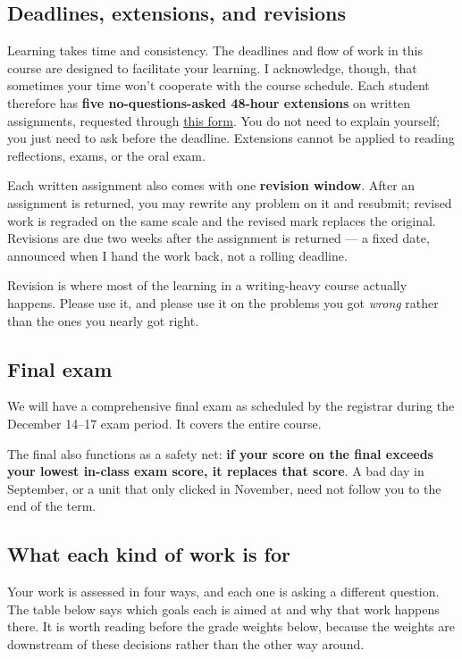 \documentclass[11pt,twoside]{amsart}
\begin{document}
\subsection*{Deadlines, extensions, and revisions}
Learning takes time and consistency. The deadlines and flow of work in this course are designed to facilitate your learning. I acknowledge, though, that sometimes your time won't cooperate with the course schedule. Each student therefore has \textbf{five no-questions-asked 48-hour extensions} on written assignments, requested through \href{https://docs.google.com/forms/d/e/1FAIpQLSfIfgx44SFtUzefTNr-80yz35MVJaUqQttt96xVTU5mCQCOgg/viewform}{this form}. You do not need to explain yourself; you just need to ask before the deadline. Extensions cannot be applied to reading reflections, exams, or the oral exam.

Each written assignment also comes with one \textbf{revision window}. After an assignment is returned, you may rewrite any problem on it and resubmit; revised work is regraded on the same scale and the revised mark replaces the original. Revisions are due two weeks after the assignment is returned --- a fixed date, announced when I hand the work back, not a rolling deadline.

Revision is where most of the learning in a writing-heavy course actually happens. Please use it, and please use it on the problems you got \emph{wrong} rather than the ones you nearly got right.

\subsection*{Final exam}
We will have a comprehensive final exam as scheduled by the registrar during the December 14--17 exam period. It covers the entire course.

The final also functions as a safety net: \textbf{if your score on the final exceeds your lowest in-class exam score, it replaces that score}. A bad day in September, or a unit that only clicked in November, need not follow you to the end of the term.

\subsection*{What each kind of work is for}
Your work is assessed in four ways, and each one is asking a different question.  The
table below says which goals each is aimed at and why that work happens there.  It is worth
reading before the grade weights below, because the weights are downstream of these
decisions rather than the other way around.
\end{document}
